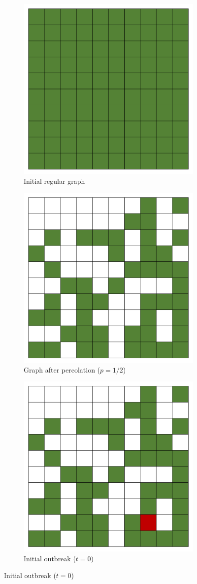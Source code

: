 \documentclass[11pt]{amsart}
\begin{document}
\begin{figure}[!ht] 
  \begin{subfigure}{0.4\linewidth}
    \centering
    \includegraphics[width=0.4\linewidth]{firebreak/original} 
    \caption{Initial regular graph} 
    \label{fig:original} 
    \vspace{4ex}
  \end{subfigure}%
  \begin{subfigure}{0.4\linewidth}
    \centering
    \includegraphics[width=0.4\linewidth]{firebreak/afterperc} 
    \caption{Graph after percolation ($p=1/2$)} 
    \label{fig:afterperc} 
    \vspace{4ex}
  \end{subfigure} 
  \begin{subfigure}{0.4\linewidth}
    \centering
    \includegraphics[width=0.4\linewidth]{firebreak/outbreak} 
    \caption{Initial outbreak ($t=0$)} 
    \label{fig:outbreak} 
  \end{subfigure}%

\end{figure}
\end{document}
